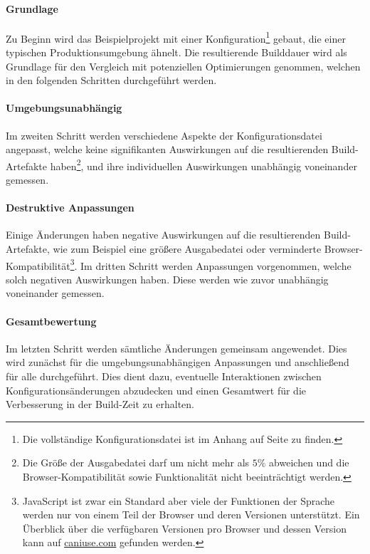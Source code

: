 \documentclass[11pt]{report}
\begin{document}
			\paragraph{Grundlage}\label{baseline-build} Zu Beginn wird das Beispielprojekt mit einer Konfiguration\footnote{Die vollständige Konfigurationsdatei ist im Anhang auf Seite \pageref{baseline-build} zu finden.} gebaut, die einer typischen Produktionsumgebung ähnelt. Die resultierende Builddauer wird als Grundlage für den Vergleich mit potenziellen Optimierungen genommen, welchen in den folgenden Schritten durchgeführt werden.

			\paragraph{Umgebungsunabhängig} Im zweiten Schritt werden verschiedene Aspekte der Konfigurationsdatei angepasst, welche keine signifikanten Auswirkungen auf die resultierenden Build-Artefakte haben\footnote{Die Größe der Ausgabedatei darf um nicht mehr als $5 \%$ abweichen und die Browser-Kompatibilität sowie Funktionalität nicht beeinträchtigt werden.}, und ihre individuellen Auswirkungen unabhängig voneinander gemessen.

			\paragraph{Destruktive Anpassungen} Einige Änderungen haben negative Auswirkungen auf die resultierenden Build-Artefakte, wie zum Beispiel eine größere Ausgabedatei oder verminderte Browser-Kompatibilität\footnote{JavaScript ist zwar ein Standard aber viele der Funktionen der Sprache werden nur von einem Teil der Browser und deren Versionen unterstützt. Ein Überblick über die verfügbaren Versionen pro Browser und dessen Version kann auf \href{https://caniuse.com/}{caniuse.com} gefunden werden.}. Im dritten Schritt werden Anpassungen vorgenommen, welche solch negativen Auswirkungen haben. Diese werden wie zuvor unabhängig voneinander gemessen.

			\paragraph{Gesamtbewertung} Im letzten Schritt werden sämtliche Änderungen gemeinsam angewendet. Dies wird zunächst für die umgebungsunabhängigen Anpassungen und anschließend für alle durchgeführt. Dies dient dazu, eventuelle Interaktionen zwischen Konfigurationsänderungen abzudecken und einen Gesamtwert für die Verbesserung in der Build-Zeit zu erhalten.
	\clearpage
\end{document}
